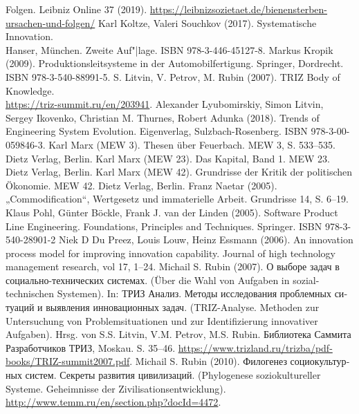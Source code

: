\documentclass[11pt,a4paper]{article}
\begin{document}
\begin{thebibliography}{xxx}
  Folgen.  Leibniz Online 37 (2019).
  \url{https://leibnizsozietaet.de/bienensterben-ursachen-und-folgen/}
 Karl Koltze, Valeri Souchkov (2017).  Systematische
  Innovation.\\ Hanser, München. Zweite Auf"|lage. ISBN 978-3-446-45127-8.
 Markus Kropik (2009). Produktionsleitsysteme in der
    Automobilfertigung. Springer, Dordrecht.\\ ISBN 978-3-540-88991-5.
 S. Litvin, V. Petrov, M. Rubin (2007). TRIZ Body of
  Knowledge. \\ \url{https://triz-summit.ru/en/203941}.
 Alexander Lyubomirskiy, Simon Litvin, Sergey Ikovenko,
  Christian M. Thurnes, Robert Adunka (2018). Trends of Engineering System
  Evolution. Eigenverlag, Sulzbach-Rosenberg.  ISBN 978-3-00-059846-3.
 Karl Marx (MEW 3).  Thesen über Feuerbach. MEW 3, S. 533--535.
  Dietz Verlag, Berlin.
 Karl Marx (MEW 23). Das Kapital, Band 1. MEW 23. Dietz Verlag,
  Berlin.
 Karl Marx (MEW 42). Grundrisse der Kritik der politischen
  Ökonomie.  MEW 42. Dietz Verlag, Berlin.
 Franz Naetar (2005). „Commodification“, Wertgesetz und
  immaterielle Arbeit. Grundrisse 14, S. 6--19.
 Klaus Pohl, Günter Böckle, Frank J. van der Linden (2005).
  Software Product Line Engineering. Foundations, Principles and Techniques.
  Springer. ISBN 978-3-540-28901-2
 Niek D Du Preez, Louis Louw, Heinz Essmann (2006). An
  innovation process model for improving innovation capability.  Journal of
  high technology management research, vol 17, 1--24.
 Michail S. Rubin (2007). \foreignlanguage{russian}{О
  выборе задач в социально-технических системах}. (Über die Wahl von Aufgaben
  in sozial-technischen Systemen). In: \foreignlanguage{russian}{ТРИЗ Анализ.
    Методы исследования проблемных ситуаций и выявления инновационных
    задач}. (TRIZ-Analyse. Methoden zur Untersuchung von Problemsituationen
  und zur Identifizierung innovativer Aufgaben). Hrsg. von S.S. Litvin,
  V.M. Petrov, M.S. Rubin. \foreignlanguage{russian}{Библиотека Саммита
    Разработчиков ТРИЗ}, Moskau. S. 35--46.
  \url{https://www.trizland.ru/trizba/pdf-books/TRIZ-summit2007.pdf}.
 Michail S. Rubin (2010).
  \foreignlanguage{russian}{Филогенез социокультурных систем. Секреты развития
    цивилизаций}.  (Phylogenese soziokultureller Systeme. Geheimnisse der
  Zivilisationsentwicklung).
  \url{http://www.temm.ru/en/section.php?docId=4472}.

\end{thebibliography}
\end{document}
